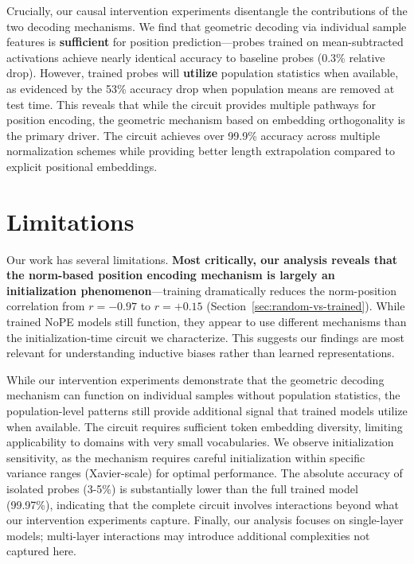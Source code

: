 \documentclass[11pt]{article}
\begin{document}
Crucially, our causal intervention experiments disentangle the contributions of the two decoding mechanisms. We find that geometric decoding via individual sample features is \textbf{sufficient} for position prediction---probes trained on mean-subtracted activations achieve nearly identical accuracy to baseline probes (0.3\% relative drop). However, trained probes will \textbf{utilize} population statistics when available, as evidenced by the 53\% accuracy drop when population means are removed at test time. This reveals that while the circuit provides multiple pathways for position encoding, the geometric mechanism based on embedding orthogonality is the primary driver. The circuit achieves over 99.9\% accuracy across multiple normalization schemes while providing better length extrapolation compared to explicit positional embeddings.

\section*{Limitations}

Our work has several limitations. \textbf{Most critically, our analysis reveals that the norm-based position encoding mechanism is largely an initialization phenomenon}---training dramatically reduces the norm-position correlation from $r=-0.97$ to $r=+0.15$ (Section~\ref{sec:random-vs-trained}). While trained NoPE models still function, they appear to use different mechanisms than the initialization-time circuit we characterize. This suggests our findings are most relevant for understanding inductive biases rather than learned representations.

While our intervention experiments demonstrate that the geometric decoding mechanism can function on individual samples without population statistics, the population-level patterns still provide additional signal that trained models utilize when available. The circuit requires sufficient token embedding diversity, limiting applicability to domains with very small vocabularies. We observe initialization sensitivity, as the mechanism requires careful initialization within specific variance ranges (Xavier-scale) for optimal performance. The absolute accuracy of isolated probes (3-5\%) is substantially lower than the full trained model (99.97\%), indicating that the complete circuit involves interactions beyond what our intervention experiments capture. Finally, our analysis focuses on single-layer models; multi-layer interactions may introduce additional complexities not captured here.
\end{document}
